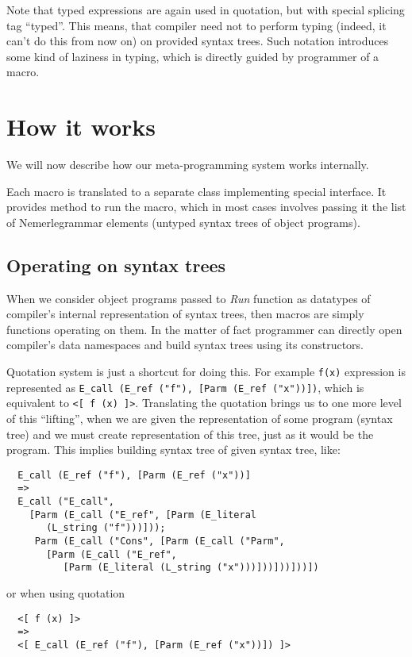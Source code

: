 \documentclass{llncs}
\newcommand{\nem}[0]{Nemerle}
\begin{document}
Note that typed expressions are again used in quotation, but with special 
splicing tag ``typed''. This means, that compiler need not to perform typing
(indeed, it can't do this from now on) on provided syntax trees. Such notation
introduces some kind of laziness in typing, which is directly guided by
programmer of a macro.

\section{How it works}
We will now describe how our meta-programming system works internally. 

Each macro is translated to a separate class implementing special interface. 
It provides method to run the macro, which in most cases involves passing
it the list of \nem grammar elements (untyped syntax trees of object 
programs). 

\subsection{Operating on syntax trees}
When we consider object programs passed to \emph{Run} function as datatypes
of compiler's internal representation of syntax trees, then macros are 
simply functions operating on them. In the matter of fact programmer can
directly open compiler's data namespaces and build syntax trees using its
constructors. 

Quotation system is just a shortcut for doing this. For example \verb,f(x),
expression is represented as \verb.E_call (E_ref ("f"), [Parm (E_ref ("x"))]).,
which is equivalent to \verb,<[ f (x) ]>,. Translating the quotation brings
us to one more level of this ``lifting'', when we are given the representation
of some program (syntax tree) and we must create representation of this tree,
just as it would be the program. This implies building syntax tree of given
syntax tree, like:

\begin{verbatim}
  E_call (E_ref ("f"), [Parm (E_ref ("x"))] 
  =>
  E_call ("E_call", 
    [Parm (E_call ("E_ref", [Parm (E_literal 
       (L_string ("f")))]));
     Parm (E_call ("Cons", [Parm (E_call ("Parm", 
       [Parm (E_call ("E_ref", 
          [Parm (E_literal (L_string ("x")))]))]))]))])
\end{verbatim}

or when using quotation

\begin{verbatim}
  <[ f (x) ]> 
  =>
  <[ E_call (E_ref ("f"), [Parm (E_ref ("x"))]) ]>
\end{verbatim}
\end{document}
